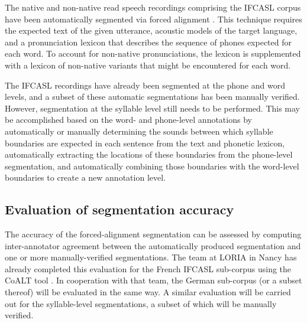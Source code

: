 	The native and non-native read speech recordings comprising the IFCASL corpus \citep{Fauth2014,Trouvain2013} have been automatically segmented via forced alignment 
	\citep{Fohr1996,Mesbahi2011}.
	This technique requires 
	the expected text of the given utterance, 
	acoustic models of the target language, and a pronunciation lexicon that describes the sequence of phones expected for each word. To account for non-native pronunciations, the lexicon is supplemented with a lexicon of non-native variants that might be encountered for each word. 
	
	
	The IFCASL recordings have already been segmented at the phone and word levels, and a subset of these automatic segmentations has been manually verified. However, segmentation at the syllable level still needs to be performed. This may be accomplished based on the word- and phone-level annotations by automatically or manually determining the sounds between which syllable boundaries are expected in each sentence from the text and phonetic lexicon, automatically extracting the locations of these boundaries from the phone-level segmentation, and automatically combining those boundaries with the word-level boundaries to create a new annotation level. 
	
	
	\subsection{Evaluation of segmentation accuracy}
	\label{sec:segmentation:eval}
	
	The accuracy of the forced-alignment segmentation can be assessed by computing inter-annotator agreement between the automatically produced segmentation and one or more manually-verified segmentations. The team at LORIA in Nancy has already completed this evaluation for the French IFCASL sub-corpus using the CoALT tool \citep{Fohr2012}. In cooperation with that team, the German sub-corpus (or a subset thereof) will be evaluated in the same way.
	A similar evaluation will be carried out for the syllable-level segmentations, a subset of which will be manually verified.

